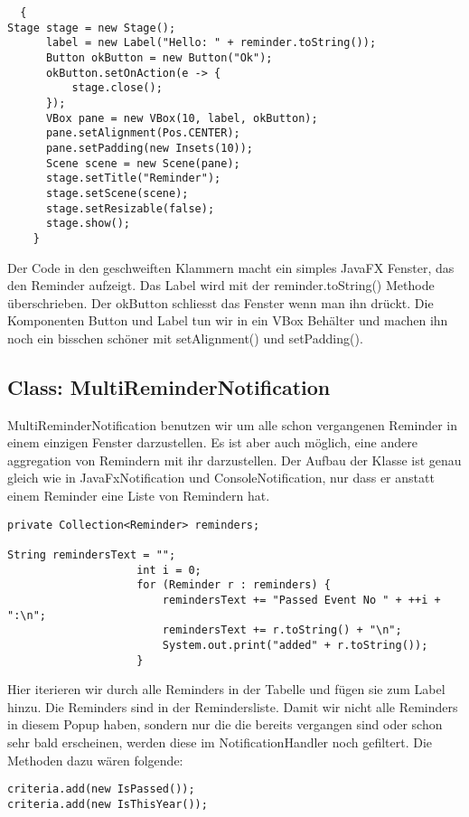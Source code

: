 \begin{lstlisting}
  {
Stage stage = new Stage();
	  label = new Label("Hello: " + reminder.toString());
	  Button okButton = new Button("Ok");
	  okButton.setOnAction(e -> {
	      stage.close();
	  });
	  VBox pane = new VBox(10, label, okButton);
	  pane.setAlignment(Pos.CENTER);
	  pane.setPadding(new Insets(10));
	  Scene scene = new Scene(pane);
	  stage.setTitle("Reminder");
	  stage.setScene(scene);
	  stage.setResizable(false);
	  stage.show();
    }
\end{lstlisting}
Der Code in den geschweiften Klammern macht ein simples JavaFX Fenster, das den Reminder aufzeigt. Das Label wird mit der reminder.toString() Methode überschrieben.
Der okButton schliesst das Fenster wenn man ihn drückt. Die Komponenten Button und Label tun wir in ein VBox Behälter und machen ihn noch ein bisschen schöner mit
setAlignment() und setPadding().


\subsection{Class: MultiReminderNotification}
MultiReminderNotification benutzen wir um alle schon vergangenen Reminder in einem einzigen Fenster darzustellen. Es ist aber auch möglich, eine andere aggregation von
Remindern mit ihr darzustellen. Der Aufbau der Klasse ist genau gleich wie in JavaFxNotification und ConsoleNotification, nur dass er anstatt einem Reminder eine Liste
von Remindern hat.
\begin{lstlisting}
private Collection<Reminder> reminders;

String remindersText = "";
                    int i = 0;
                    for (Reminder r : reminders) {
                        remindersText += "Passed Event No " + ++i + ":\n";
                        remindersText += r.toString() + "\n";
                        System.out.print("added" + r.toString());
                    }
\end{lstlisting}
Hier iterieren wir durch alle Reminders in der Tabelle und fügen sie zum Label hinzu. Die Reminders sind in der Remindersliste. Damit wir nicht alle Reminders in diesem Popup
haben, sondern nur die die bereits vergangen sind oder schon sehr bald erscheinen, werden diese im NotificationHandler noch gefiltert.
Die Methoden dazu wären folgende:
\begin{lstlisting}
criteria.add(new IsPassed());
criteria.add(new IsThisYear());
\end{lstlisting}

